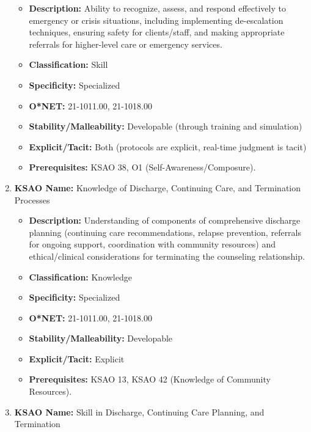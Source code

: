 \documentclass[
  letterpaper,
  DIV=11,
  numbers=noendperiod]{scrartcl}
\providecommand{\tightlist}{%
  \setlength{\itemsep}{0pt}\setlength{\parskip}{0pt}}
\begin{document}
\begin{enumerate}
  \begin{itemize}
  \tightlist
  \item
    \textbf{Description:} Ability to recognize, assess, and respond
    effectively to emergency or crisis situations, including
    implementing de-escalation techniques, ensuring safety for
    clients/staff, and making appropriate referrals for higher-level
    care or emergency services.
  \item
    \textbf{Classification:} Skill
  \item
    \textbf{Specificity:} Specialized
  \item
    \textbf{O*NET:} 21-1011.00, 21-1018.00
  \item
    \textbf{Stability/Malleability:} Developable (through training and
    simulation)
  \item
    \textbf{Explicit/Tacit:} Both (protocols are explicit, real-time
    judgment is tacit)
  \item
    \textbf{Prerequisites:} KSAO 38, O1 (Self-Awareness/Composure).
  \end{itemize}
\item
  \textbf{KSAO Name:} Knowledge of Discharge, Continuing Care, and
  Termination Processes

  \begin{itemize}
  \tightlist
  \item
    \textbf{Description:} Understanding of components of comprehensive
    discharge planning (continuing care recommendations, relapse
    prevention, referrals for ongoing support, coordination with
    community resources) and ethical/clinical considerations for
    terminating the counseling relationship.
  \item
    \textbf{Classification:} Knowledge
  \item
    \textbf{Specificity:} Specialized
  \item
    \textbf{O*NET:} 21-1011.00, 21-1018.00
  \item
    \textbf{Stability/Malleability:} Developable
  \item
    \textbf{Explicit/Tacit:} Explicit
  \item
    \textbf{Prerequisites:} KSAO 13, KSAO 42 (Knowledge of Community
    Resources).
  \end{itemize}
\item
  \textbf{KSAO Name:} Skill in Discharge, Continuing Care Planning, and
  Termination


\end{enumerate}
\end{document}
